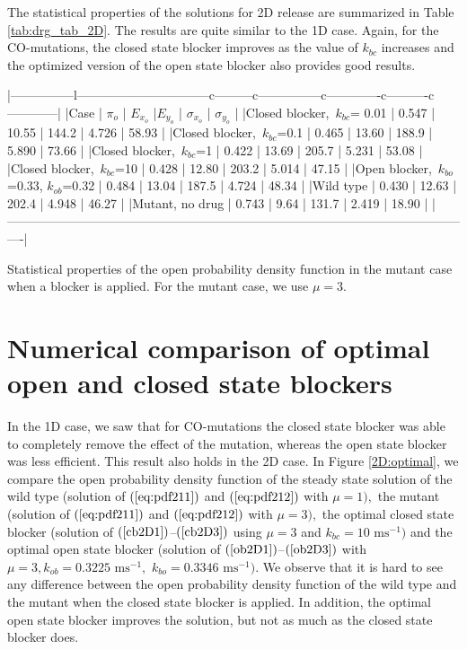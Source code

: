 {The statistical properties of the solutions for 2D release are summarized in Table \ref{tab:drg_tab_2D}. The results are quite similar to the 1D case. Again, for the CO-mutations, the closed state blocker improves as the value of $k_{bc}$ increases and the optimized version of the open state blocker also provides good results.


|---------------l--------------------------------c---------c---------------c-------------c----------c------------|
|Case                                        | $\pi_o$ | $E_{x_o}$ |$E_{y_o}$ | $\sigma_{x_o}$ | $\sigma_{y_o}$  |
|Closed blocker,\ $k_{bc}$= 0.01             | 0.547   | 10.55     | 144.2    | 4.726          |  58.93          |
|Closed blocker,\ $k_{bc}$=0.1               | 0.465   | 13.60     | 188.9    | 5.890          |  73.66          |
|Closed blocker,\ $k_{bc}$=1                 | 0.422   | 13.69     | 205.7    | 5.231          |  53.08          |
|Closed blocker,\ $k_{bc}$=10                | 0.428   | 12.80     | 203.2    | 5.014          |  47.15          |
|Open blocker,\ $k_{bo}$=0.33, $k_{ob}$=0.32 | 0.484   | 13.04     | 187.5    | 4.724          |  48.34          |
|Wild type                                   | 0.430   | 12.63     | 202.4    | 4.948          |  46.27          |
|Mutant, no drug                             | 0.743   | 9.64      | 131.7    | 2.419          |  18.90          |
|----------------------------------------------------------------------------------------------------------------|

Statistical properties of the open probability density function in the mutant case when a blocker is applied.  For the mutant case, we use $\mu=3$.
\label{tab:drg_tab_2D}



\section[Numerical comparison of blockers]{Numerical comparison of optimal open and closed state blockers}

In the 1D case, we saw that for CO-mutations the closed state blocker was able 
to completely remove the effect of the mutation, whereas the open state blocker 
was less efficient.
This result also holds in the 2D case. In Figure \ref{2D:optimal}, we compare the open
probability density function of the steady state solution of the wild type
(solution of $(\ref{eq:pdf211})$ and $(\ref{eq:pdf212})$ with $\mu=1),$ the mutant
(solution of $(\ref{eq:pdf211})$ and $(\ref{eq:pdf212})$ with $\mu=3),$ the optimal closed state blocker
(solution of $(\ref{cb2D1})$--$(\ref{cb2D3})$ using $\mu=3$ and $k_{bc}=10\text{ ms}^{-1})$ and the optimal
open state blocker (solution of $(\ref{ob2D1})$--$(\ref{ob2D3})$ with $\mu=3,k_{ob}=0.3225\text{ ms}^{-1},$
$k_{bo}=0.3346\text{ ms}^{-1}).$ We observe that it is hard to see any difference between the open probability
density function of the wild type and the mutant when the closed state blocker is applied. In addition,
the optimal open state blocker improves the solution, but not as much as the closed state blocker does.

}
